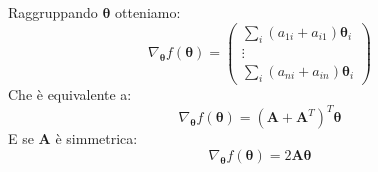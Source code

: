 \documentclass{article}
\begin{document}
            Raggruppando $\mathbf{\theta}$ otteniamo:
            \[\nabla_\mathbf{\theta}f(\mathbf{\theta}) = \begin{pmatrix}
                \sum_i (a_{1i} + a_{i1})\mathbf{\theta}_i \\
                \vdots \\
                \sum_i (a_{ni} + a_{in})\mathbf{\theta}_i
            \end{pmatrix}\]  
            Che è equivalente a:
            \[\nabla_\mathbf{\theta}f(\mathbf{\theta}) = (\mathbf{A} + \mathbf{A}^T)^T\mathbf{\theta}\]
            E se $\mathbf{A}$ è simmetrica:
            \[ \nabla_\mathbf{\theta}f(\mathbf{\theta}) = 2\mathbf{A\theta}\]
\end{document}
